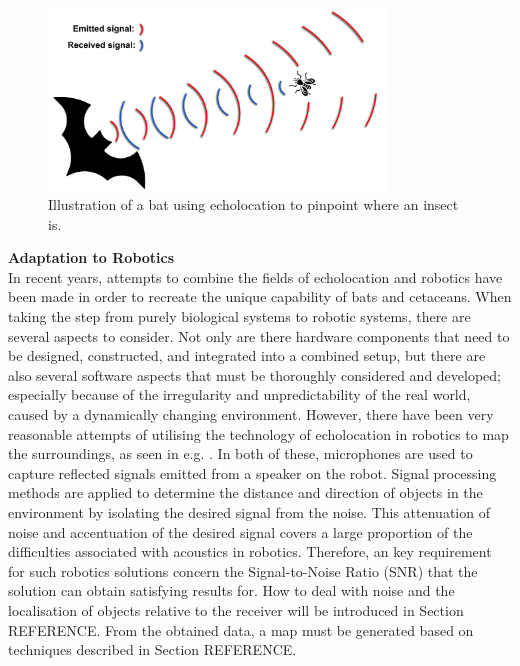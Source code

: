 \begin{figure}[H]
    \centering
    \includegraphics[width=0.8\textwidth]{figures/1Problem_analysis/Bat_echolocation.pdf}
    \caption{Illustration of a bat using echolocation to pinpoint where an insect is.}
    \label{fig:bat_echolocation}
\end{figure}

\textbf{Adaptation to Robotics}\\
In recent years, attempts to combine the fields of echolocation and robotics have been made in order to recreate the unique capability of bats and cetaceans. When taking the step from purely biological systems to robotic systems, there are several aspects to consider. Not only are there hardware components that need to be designed, constructed, and integrated into a combined setup, but there are also several software aspects that must be thoroughly considered and developed; especially because of the irregularity and unpredictability of the real world, caused by a dynamically changing environment. However, there have been very reasonable attempts of utilising the technology of echolocation in robotics to map the surroundings, as seen in e.g. \cite{Echolocation:Robat, Echolocation:Jesper_experiment}. In both of these, microphones are used to capture reflected signals emitted from a speaker on the robot. Signal processing methods are applied to determine the distance and direction of objects in the environment by isolating the desired signal from the noise. This attenuation of noise and accentuation of the desired signal covers a large proportion of the difficulties associated with acoustics in robotics. Therefore, an key requirement for such robotics solutions concern the Signal-to-Noise Ratio (\gls{SNR}) that the solution can obtain satisfying results for. How to deal with noise and the localisation of objects relative to the receiver will be introduced in Section REFERENCE. From the obtained data, a map must be generated based on techniques described in Section REFERENCE.


